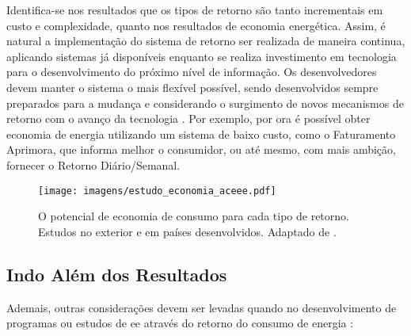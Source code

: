 Identifica-se nos resultados que os tipos de retorno são tanto incrementais
em custo e complexidade, quanto nos resultados de economia energética. Assim, 
é natural a implementação do sistema de retorno ser realizada de 
maneira continua, aplicando sistemas já disponíveis enquanto se realiza 
investimento em tecnologia para o desenvolvimento do
próximo nível de informação. Os desenvolvedores devem
manter o sistema o mais flexível possível, sendo desenvolvidos 
sempre preparados para a mudança e considerando o surgimento de novos 
mecanismos de retorno com o avanço da tecnologia 
\cite{aceee_2010_estudos_feedback}. Por exemplo, por ora é possível obter
economia de energia utilizando um sistema de baixo custo, como o Faturamento
Aprimora, que informa melhor o consumidor, ou até mesmo, com mais ambição, 
fornecer o Retorno Diário/Semanal.

\begin{figure}[h!t]
\centering
\texttt{[image: imagens/estudo\_economia\_aceee.pdf]}
\caption[O potencial de consumo para cada tipo de retorno]
{O potencial de economia de consumo para cada tipo de retorno. Estudos
no exterior e em países desenvolvidos. Adaptado de
\cite{aceee_2010_estudos_feedback}.}
\label{fig:potencial_consumo_retorno}
\end{figure}


\subsection{Indo Além dos Resultados}
\label{ssec:ret_outros}

Ademais, outras considerações devem ser levadas quando no desenvolvimento 
de programas ou estudos de \gls{ee} através do retorno do consumo de energia
\cite{aceee_2010_estudos_feedback,2006_darby,2009_epri}:

